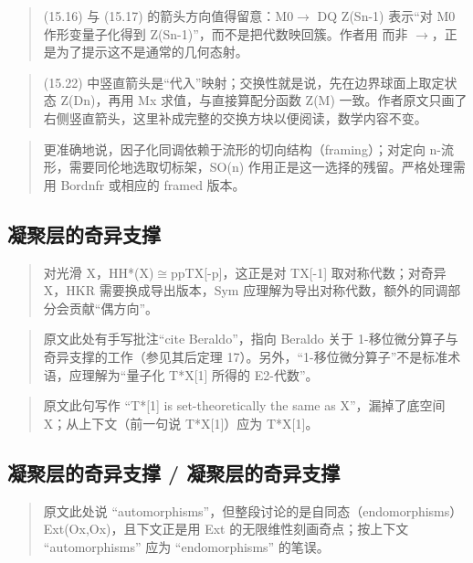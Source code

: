 \begin{quote}\small
(15.16) 与 (15.17) 的箭头方向值得留意：M0$\to$ DQ Z(Sn-1) 表示“对 M0 作形变量子化得到 Z(Sn-1)”，而不是把代数映回簇。作者用 而非 $\to$，正是为了提示这不是通常的几何态射。
\end{quote}

\begin{quote}\small
(15.22) 中竖直箭头是“代入”映射；交换性就是说，先在边界球面上取定状态 Z(Dn)，再用 Mx 求值，与直接算配分函数 Z(M) 一致。作者原文只画了右侧竖直箭头，这里补成完整的交换方块以便阅读，数学内容不变。
\end{quote}

\begin{quote}\small
更准确地说，因子化同调依赖于流形的切向结构（framing）；对定向 n-流形，需要同伦地选取切标架，SO(n) 作用正是这一选择的残留。严格处理需用 Bordnfr 或相应的 framed 版本。
\end{quote}

\subsection*{凝聚层的奇异支撑}
\begin{quote}\small
对光滑 X，HH*(X)$\cong$ppTX[-p]，这正是对 TX[-1] 取对称代数；对奇异 X，HKR 需要换成导出版本，Sym 应理解为导出对称代数，额外的同调部分会贡献“偶方向”。
\end{quote}

\begin{quote}\small
原文此处有手写批注“cite Beraldo”，指向 Beraldo 关于 1-移位微分算子与奇异支撑的工作（参见其后定理 17）。另外，“1-移位微分算子”不是标准术语，应理解为“量子化 T*X[1] 所得的 E2-代数”。
\end{quote}

\begin{quote}\small
原文此句写作 “T*[1] is set-theoretically the same as X”，漏掉了底空间 X；从上下文（前一句说 T*X[1]）应为 T*X[1]。
\end{quote}

\subsection*{凝聚层的奇异支撑 / 凝聚层的奇异支撑}
\begin{quote}\small
原文此处说 “automorphisms”，但整段讨论的是自同态（endomorphisms）Ext(Ox,Ox)，且下文正是用 Ext 的无限维性刻画奇点；按上下文 “automorphisms” 应为 “endomorphisms” 的笔误。
\end{quote}

